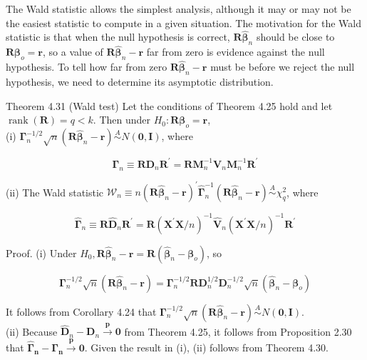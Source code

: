 \documentclass[10pt]{article}
\begin{document}
The Wald statistic allows the simplest analysis, although it may or may not be the easiest statistic to compute in a given situation. The motivation for the Wald statistic is that when the null hypothesis is correct, $\mathbf{R} \hat{\boldsymbol{\beta}}_{n}$ should be close to $\mathbf{R} \boldsymbol{\beta}_{o}=\mathbf{r}$, so a value of $\mathbf{R} \hat{\boldsymbol{\beta}}_{n}-\mathbf{r}$ far from zero is evidence against the null hypothesis. To tell how far from zero $\mathbf{R} \hat{\boldsymbol{\beta}}_{n}-\mathbf{r}$ must be before we reject the null hypothesis, we need to determine its asymptotic distribution.

Theorem 4.31 (Wald test) Let the conditions of Theorem 4.25 hold and let $\operatorname{rank}(\mathbf{R})=q<k$. Then under $H_{0}: \mathbf{R} \boldsymbol{\beta}_{o}=\mathbf{r}$,\\
(i) $\boldsymbol{\Gamma}_{n}^{-1 / 2} \sqrt{n}\left(\mathbf{R} \hat{\boldsymbol{\beta}}_{n}-\mathbf{r}\right) \stackrel{A}{\sim} N(\mathbf{0}, \mathbf{I})$, where

$$
\boldsymbol{\Gamma}_{n} \equiv \mathbf{R} \mathbf{D}_{n} \mathbf{R}^{\prime}=\mathbf{R} \mathbf{M}_{n}^{-1} \mathbf{V}_{n} \mathbf{M}_{n}^{-1} \mathbf{R}^{\prime}
$$

(ii) The Wald statistic $\mathcal{W}_{n} \equiv n\left(\mathbf{R} \hat{\boldsymbol{\beta}}_{n}-\mathbf{r}\right)^{\prime} \hat{\boldsymbol{\Gamma}}_{n}^{-1}\left(\mathbf{R} \hat{\boldsymbol{\beta}}_{n}-\mathbf{r}\right) \stackrel{A}{\sim} \chi_{q}^{2}$, where

$$
\hat{\boldsymbol{\Gamma}}_{n} \equiv \mathbf{R} \hat{\mathbf{D}}_{n} \mathbf{R}^{\prime}=\mathbf{R}\left(\mathbf{X}^{\prime} \mathbf{X} / n\right)^{-1} \hat{\mathbf{V}}_{n}\left(\mathbf{X}^{\prime} \mathbf{X} / n\right)^{-1} \mathbf{R}^{\prime}
$$

Proof. (i) Under $H_{0}, \mathbf{R} \hat{\boldsymbol{\beta}}_{n}-\mathbf{r}=\mathbf{R}\left(\hat{\boldsymbol{\beta}}_{n}-\boldsymbol{\beta}_{o}\right)$, so

$$
\boldsymbol{\Gamma}_{n}^{-1 / 2} \sqrt{n}\left(\mathbf{R} \hat{\boldsymbol{\beta}}_{n}-\mathbf{r}\right)=\boldsymbol{\Gamma}_{n}^{-1 / 2} \mathbf{R D}_{n}^{1 / 2} \mathbf{D}_{n}^{-1 / 2} \sqrt{n}\left(\hat{\boldsymbol{\beta}}_{n}-\boldsymbol{\beta}_{o}\right)
$$

It follows from Corollary 4.24 that $\boldsymbol{\Gamma}_{n}^{-1 / 2} \sqrt{n}\left(\mathbf{R} \hat{\boldsymbol{\beta}}_{n}-\mathbf{r}\right) \stackrel{A}{\sim} N(\mathbf{0}, \mathbf{I})$.\\
(ii) Because $\hat{\mathbf{D}}_{n}-\mathbf{D}_{n} \xrightarrow{\boldsymbol{p}} \mathbf{0}$ from Theorem 4.25, it follows from Proposition 2.30 that $\hat{\boldsymbol{\Gamma}}_{\boldsymbol{n}}-\boldsymbol{\Gamma}_{\boldsymbol{n}} \xrightarrow{\boldsymbol{p}} \mathbf{0}$. Given the result in (i), (ii) follows from Theorem 4.30.
\end{document}
